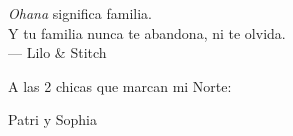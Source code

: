 \thispagestyle{empty}
{}

\vspace*{3cm}

\begin{center}
    \emph{Ohana} significa familia. \\
    Y tu familia nunca te abandona, ni te olvida. \\ \medskip
    --- Lilo \& Stitch
\end{center}

\medskip

\begin{center}
	A las 2 chicas que marcan mi Norte: 
	\linebreak[3]
	\begin{large}
		Patri y Sophia
	\end{large}
	 \\ \smallskip
\end{center}
